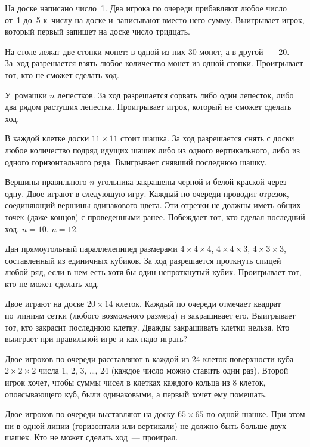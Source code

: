 \begin{problems}

\item
На доске написано число~1.
Два игрока по очереди прибавляют любое число от~1 до~5 к~числу на доске
и~записывают вместо него сумму.
Выигрывает игрок, который первый запишет на доске число тридцать.

\item
На столе лежат две стопки монет: в одной из них 30 монет, а в другой~--- 20.
За~ход разрешается взять любое количество монет из одной стопки.
Проигрывает тот, кто не сможет сделать ход.

\item
У~ромашки $n$ лепестков.
За ход разрешается сорвать либо один лепесток, либо два рядом растущих
лепестка.
Проигрывает игрок, который не сможет сделать ход.

\item
В каждой клетке доски $11 \times 11$ стоит шашка.
За ход разрешается снять с доски любое количество подряд идущих шашек либо из
одного вертикального, либо из одного горизонтального ряда.
Выигрывает снявший последнюю шашку.

\item
Вершины правильного $n$-угольника закрашены черной и белой краской через одну.
Двое играют в следующую игру.
Каждый по очереди проводит отрезок, соединяющий вершины одинакового цвета.
Эти отрезки не должны иметь общих точек (даже концов) с проведенными ранее.
Побеждает тот, кто сделал последний ход.
\qquad
\sbp $n = 10$.
\qquad
\sbp $n = 12$.
   
\item
Дан прямоугольный параллелепипед размерами
\quad
\sbp $4 \times 4 \times 4$,
\quad
\sbp $4 \times 4 \times 3$,
\quad
\sbp $4 \times 3 \times 3$,
\quad
составленный из единичных кубиков.
За ход разрешается проткнуть спицей любой ряд, если в нем есть хотя бы один
непроткнутый кубик.
Проигрывает тот, кто не может сделать ход.

\item
Двое играют на доске $20 \times 14$ клеток.
Каждый по очереди отмечает квадрат по~линиям сетки (любого возможного размера)
и закрашивает его.
Выигрывает тот, кто закрасит последнюю клетку.
Дважды закрашивать клетки нельзя.
Кто выиграет при правильной игре и как надо играть?

\item
Двое игроков по очереди расставляют в каждой из 24 клеток поверхности куба
$2 \times 2 \times 2 $ числа 1, 2, 3, \ldots, 24
(каждое число можно ставить один раз).
Второй игрок хочет, чтобы суммы чисел в клетках каждого кольца из 8 клеток,
опоясывающего куб, были одинаковыми, а первый хочет ему помешать.

\item
Двое игроков по очереди выставляют на доску $65 \times 65$ по одной шашке.
При этом ни в одной линии (горизонтали или вертикали) не должно быть больше
двух шашек.
Кто не может сделать ход~--- проиграл.

\end{problems}

